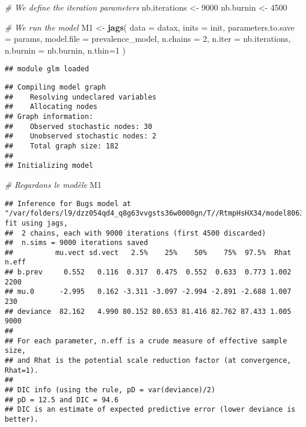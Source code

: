 \documentclass[
]{article}
\newenvironment{Shaded}{\begin{snugshade}}{\end{snugshade}}
\newcommand{\AttributeTok}[1]{\textcolor[rgb]{0.13,0.29,0.53}{#1}}
\newcommand{\CommentTok}[1]{\textcolor[rgb]{0.56,0.35,0.01}{\textit{#1}}}
\newcommand{\DecValTok}[1]{\textcolor[rgb]{0.00,0.00,0.81}{#1}}
\newcommand{\FunctionTok}[1]{\textcolor[rgb]{0.13,0.29,0.53}{\textbf{#1}}}
\newcommand{\NormalTok}[1]{#1}
\newcommand{\OtherTok}[1]{\textcolor[rgb]{0.56,0.35,0.01}{#1}}
\begin{document}
\begin{Shaded}
\begin{Highlighting}[]
\CommentTok{\# We define the iteration parameters}
\NormalTok{nb.iterations }\OtherTok{\textless{}{-}} \DecValTok{9000}
\NormalTok{nb.burnin }\OtherTok{\textless{}{-}} \DecValTok{4500}

\CommentTok{\# We run the model}
\NormalTok{M1 }\OtherTok{\textless{}{-}} \FunctionTok{jags}\NormalTok{(}
  \AttributeTok{data =}\NormalTok{ datax,}
  \AttributeTok{inits =}\NormalTok{ init,}
  \AttributeTok{parameters.to.save =}\NormalTok{ params,}
  \AttributeTok{model.file =}\NormalTok{ prevalence\_model,}
  \AttributeTok{n.chains =} \DecValTok{2}\NormalTok{,}
  \AttributeTok{n.iter =}\NormalTok{ nb.iterations,}
  \AttributeTok{n.burnin =}\NormalTok{ nb.burnin,}
  \AttributeTok{n.thin=}\DecValTok{1}
\NormalTok{)}
\end{Highlighting}
\end{Shaded}

\begin{verbatim}
## module glm loaded
\end{verbatim}

\begin{verbatim}
## Compiling model graph
##    Resolving undeclared variables
##    Allocating nodes
## Graph information:
##    Observed stochastic nodes: 30
##    Unobserved stochastic nodes: 2
##    Total graph size: 182
## 
## Initializing model
\end{verbatim}

\begin{Shaded}
\begin{Highlighting}[]
\CommentTok{\# Regardons le modèle }
\NormalTok{M1}
\end{Highlighting}
\end{Shaded}

\begin{verbatim}
## Inference for Bugs model at "/var/folders/l9/dzz054qd4_q8g63vvgsts36w0000gn/T//RtmpHsHX34/model8063568b0f3f.txt", fit using jags,
##  2 chains, each with 9000 iterations (first 4500 discarded)
##  n.sims = 9000 iterations saved
##          mu.vect sd.vect   2.5%    25%    50%    75%  97.5%  Rhat n.eff
## b.prev     0.552   0.116  0.317  0.475  0.552  0.633  0.773 1.002  2200
## mu.0      -2.995   0.162 -3.311 -3.097 -2.994 -2.891 -2.688 1.007   230
## deviance  82.162   4.990 80.152 80.653 81.416 82.762 87.433 1.005  9000
## 
## For each parameter, n.eff is a crude measure of effective sample size,
## and Rhat is the potential scale reduction factor (at convergence, Rhat=1).
## 
## DIC info (using the rule, pD = var(deviance)/2)
## pD = 12.5 and DIC = 94.6
## DIC is an estimate of expected predictive error (lower deviance is better).
\end{verbatim}
\end{document}
